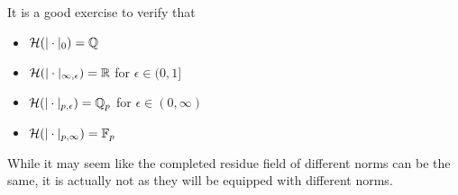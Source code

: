 It is a good exercise to verify that 
\begin{itemize}
	\item  $\mathcal{H}(|\cdot |_0) = \mathbb{Q}$ 
	\item $\mathcal{H} (|\cdot |_{\infty, \epsilon}) = \mathbb{R}$ for $\epsilon \in (0, 1]$
	\item $\mathcal{H} (|\cdot |_{p, \epsilon}) = \mathbb{Q}_p$ for $\epsilon \in (0, \infty)$
	\item $\mathcal{H} (|\cdot |_{p, \infty}) = \mathbb{F}_p$ 
\end{itemize}
While it may seem like the completed residue field of different norms can be the same, it is actually not as they will be equipped with different norms.  

